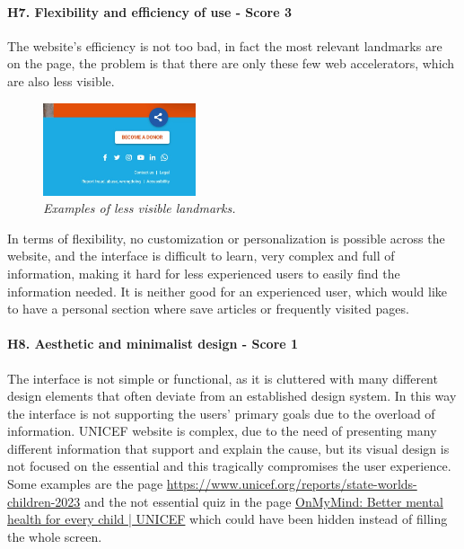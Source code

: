 \newline
\newline \paragraph{H7. Flexibility and efficiency of use - Score 3} \label{subsec:H7}	The website's efficiency is not too bad, in fact the most relevant landmarks are on the page, the problem is that there are only these few web accelerators, which are also less visible.
\begin{figure}[!h]
	\begin{center}
		\includegraphics[width=0.4\textwidth]{FinalScores13.jpg}
		\captionsetup{font=small}
		\caption{\textit{Examples of less visible landmarks.}}
	\end{center}
\end{figure}
\newline In terms of flexibility, no customization or personalization is possible across the website, and the interface is difficult to learn, very complex and full of information, making it hard for less experienced users to easily find the information needed. It is neither good for an experienced user, which would like to have a personal section where save articles or frequently visited pages.
\newline
\newline \paragraph{H8. Aesthetic and minimalist design - Score 1} \label{subsec:H8}	The interface is not simple or functional, as it is cluttered with many different design elements that often deviate from an established design system. In this way the interface is not supporting the users’ primary goals due to the overload of information.
\newline UNICEF website is complex, due to the need of presenting many different information that support and explain the cause, but its visual design is not focused on the essential and this tragically compromises the user experience.
\newline Some examples are the page \href{https://www.unicef.org/reports/state-worlds-children-2023}{https://www.unicef.org/reports/state-worlds-children-2023} and the not essential quiz in the page \href{https://www.unicef.org/on-my-mind}{OnMyMind: Better mental health for every child | UNICEF} which could have been hidden instead of filling the whole screen. 
